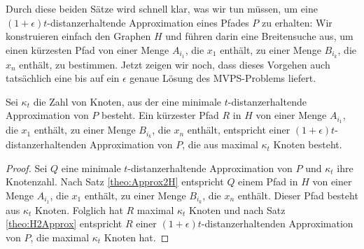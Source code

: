     Durch diese beiden Sätze wird schnell klar, was wir tun müssen, um eine $(1+\epsilon)t$-distanzerhaltende Approximation eines Pfades $P$ zu erhalten: 
    Wir konstruieren einfach den Graphen $H$ und führen darin eine Breitensuche aus, um einen kürzesten Pfad von einer Menge $A_{i_1}$, die $x_1$ enthält, zu einer Menge $B_{i_k}$, die $x_n$ enthält, zu bestimmen. 
    Jetzt zeigen wir noch, dass dieses Vorgehen auch tatsächlich eine bis auf ein $\epsilon$ genaue Lösung des MVPS-Problems liefert.
    
    \begin{theorem}
    	\label{theo:mvpsvertices}
    	Sei $\kappa_t$ die Zahl von Knoten, aus der eine minimale $t$-distanzerhaltende Approximation von $P$ besteht.
    	Ein kürzester Pfad $R$ in $H$ von einer Menge $A_{i_1}$, die $x_1$ enthält, zu einer Menge $B_{i_k}$, die $x_n$ enthält, entspricht einer $(1 + \epsilon)t$-distanzerhaltenden Approximation von $P$, die aus maximal $\kappa_t$ Knoten besteht.
    \end{theorem}
    \begin{proof}
    	Sei $Q$ eine minimale $t$-distanzerhaltende Approximation von $P$ und $\kappa_t$ ihre Knotenzahl. 
    	Nach Satz \ref{theo:Approx2H} entspricht $Q$ einem Pfad in $H$ von einer Menge $A_{i_1}$, die $x_1$ enthält, zu einer Menge $B_{i_k}$, die $x_n$ enthält. 
    	Dieser Pfad besteht aus $\kappa_t$ Knoten. 
    	Folglich hat $R$ maximal $\kappa_t$ Knoten und nach Satz \ref{theo:H2Approx} entspricht $R$ einer $(1 + \epsilon)t$-distanzerhaltenden Approximation von $P$, die maximal $\kappa_t$ Knoten hat.
    \end{proof}
    
